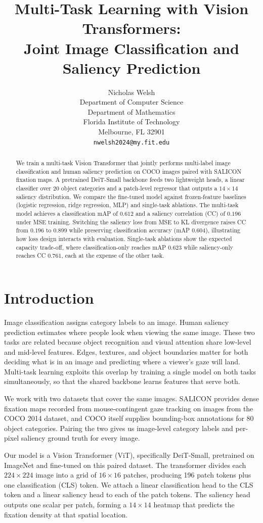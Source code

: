 \documentclass{article}
\title{Multi-Task Learning with Vision Transformers:\\Joint Image Classification and Saliency Prediction}
\author{%
 Nicholas Welsh \\
  Department of Computer Science\\
  Department of Mathematics \\
  Florida Institute of Technology\\
  Melbourne, FL 32901 \\
  \texttt{nwelsh2024@my.fit.edu}
}
\begin{document}
\maketitle

\begin{abstract}
We train a multi-task Vision Transformer that jointly performs multi-label image classification and human saliency prediction on COCO images paired with SALICON fixation maps. A pretrained DeiT-Small backbone feeds two lightweight heads, a linear classifier over 20 object categories and a patch-level regressor that outputs a $14\!\times\!14$ saliency distribution. We compare the fine-tuned model against frozen-feature baselines (logistic regression, ridge regression, MLP) and single-task ablations. The multi-task model achieves a classification mAP of $0.612$ and a saliency correlation (CC) of $0.196$ under MSE training. Switching the saliency loss from MSE to KL divergence raises CC from $0.196$ to $0.899$ while preserving classification accuracy (mAP $0.604$), illustrating how loss design interacts with evaluation. Single-task ablations show the expected capacity trade-off, where classification-only reaches mAP $0.623$ while saliency-only reaches CC $0.761$, each at the expense of the other task.
\end{abstract}

\section{Introduction}

Image classification assigns category labels to an image. Human saliency prediction estimates where people look when viewing the same image. These two tasks are related because object recognition and visual attention share low-level and mid-level features. Edges, textures, and object boundaries matter for both deciding what is in an image and predicting where a viewer's gaze will land. Multi-task learning exploits this overlap by training a single model on both tasks simultaneously, so that the shared backbone learns features that serve both.

We work with two datasets that cover the same images. SALICON provides dense fixation maps recorded from mouse-contingent gaze tracking on images from the COCO 2014 dataset, and COCO itself supplies bounding-box annotations for 80 object categories. Pairing the two gives us image-level category labels and per-pixel saliency ground truth for every image.

Our model is a Vision Transformer (ViT), specifically DeiT-Small, pretrained on ImageNet and fine-tuned on this paired dataset. The transformer divides each $224\!\times\!224$ image into a grid of $16\!\times\!16$ patches, producing 196 patch tokens plus one classification (CLS) token. We attach a linear classification head to the CLS token and a linear saliency head to each of the patch tokens. The saliency head outputs one scalar per patch, forming a $14\!\times\!14$ heatmap that predicts the fixation density at that spatial location.
\end{document}
